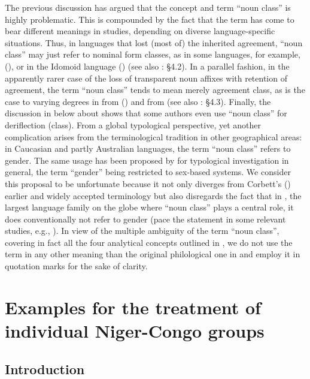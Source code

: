 \documentclass[output=collectionpaper]{langsci/langscibook}
\begin{document}
The previous discussion has argued that the  concept and term ``noun class'' is highly problematic. This is compounded by the fact that the term has come to bear different meanings in  studies, depending on diverse language-specific situations. Thus, in languages that lost (most of) the inherited agreement, ``noun class'' may just refer to nominal form classes, as in some  languages, for example,  (\citealt{Canu1976}), or in the Idomoid language  (\citealt{Abiodun1989}) (see also \citealt{Good2012a}: §4.2). In a parallel fashion, in the apparently rarer case of the loss of transparent noun affixes with retention of agreement, the term ``noun class'' tends to mean merely agreement class, as is the case to varying degrees in  from  (\citealt{Babou2016}) and  from  \citep{Voll2017} (see also \citealt{Good2012a}: §4.3). Finally, the discussion in  below about  shows that some authors even use ``noun class'' for deriflection (class). From a global typological perspective, yet another complication arises from the terminological tradition in other geographical areas: in Caucasian and partly Australian languages, the term ``noun class'' refers to gender. The same usage has been proposed by \citet{Aikhenvald2000} for typological investigation in general, the term ``gender'' being restricted to sex-based systems. We consider this proposal to be unfortunate because it not only diverges from Corbett's (\citeyear{Corbett1991}) earlier and widely accepted terminology but also disregards the fact that in , the largest language family on the globe where ``noun class'' plays a central role, it does conventionally not refer to gender (pace the statement in some relevant studies, e.g., \citealt[1]{Kilarski2013}). In view of the multiple ambiguity of the term ``noun class'', covering in fact all the four analytical concepts outlined in , we do not use the term in any other meaning than the original philological one in  and employ it in quotation marks for the sake of clarity.

\section{Examples for the treatment of individual Niger-Congo groups}
\label{sec:Gueld:3}



\subsection{Introduction}
\end{document}
